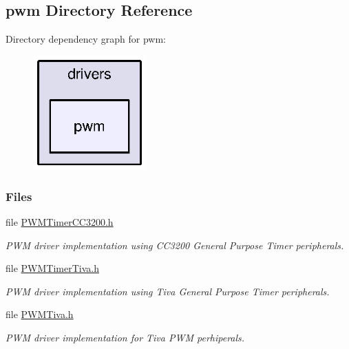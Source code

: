 \subsection{pwm Directory Reference}
\label{dir_76361b7eb9227ce140ba2f526acb4722}
Directory dependency graph for pwm\-:
\nopagebreak
\begin{figure}[H]
\begin{center}
\leavevmode
\includegraphics[width=123pt]{dir_76361b7eb9227ce140ba2f526acb4722_dep}
\end{center}
\end{figure}
\subsubsection*{Files}
\begin{DoxyCompactItemize}
\item 
file \hyperlink{_p_w_m_timer_c_c3200_8h}{P\-W\-M\-Timer\-C\-C3200.\-h}
\begin{DoxyCompactList}\small\item\em P\-W\-M driver implementation using C\-C3200 General Purpose Timer peripherals. \end{DoxyCompactList}\item 
file \hyperlink{_p_w_m_timer_tiva_8h}{P\-W\-M\-Timer\-Tiva.\-h}
\begin{DoxyCompactList}\small\item\em P\-W\-M driver implementation using Tiva General Purpose Timer peripherals. \end{DoxyCompactList}\item 
file \hyperlink{_p_w_m_tiva_8h}{P\-W\-M\-Tiva.\-h}
\begin{DoxyCompactList}\small\item\em P\-W\-M driver implementation for Tiva P\-W\-M perhiperals. \end{DoxyCompactList}\end{DoxyCompactItemize}

